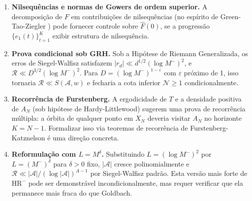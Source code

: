 \documentclass[12pt,a4paper]{article}
\theoremstyle{definition}
\newcommand{\HRm}{\mathrm{HR}^{-}}
\begin{document}
	\begin{enumerate}
		\item \textbf{Nilsequências e normas de Gowers de ordem superior.} A
		decomposição de $F$ em contribuições de nilsequências (no espírito de
		Green-Tao-Ziegler \cite{greentao}) pode fornecer controle sobre
		$\widehat{F}(0)$, se a progressão $\{e_1(t)\}_{t=1}^K$ exibir
		estrutura de nilsequência.
		
		\item \textbf{Prova condicional sob GRH.} Sob a Hipótese de Riemann
		Generalizada, os erros de Siegel-Walfisz satisfazem
		$|r_d| \ll d^{1/2}(\log M^-)^2$, e $\mathcal{R} \ll
		D^{3/2}(\log M^-)^2$. Para $D = (\log M^-)^{1-\varepsilon}$ com
		$\varepsilon$ próximo de 1, isso tornaria $\mathcal{R} \ll
		S(\mathcal{A},w)$ e fecharia a cota inferior $\mathcal{N} \geq 1$
		condicionalmente.
		
		\item \textbf{Recorrência de Furstenberg.} A ergodicidade de $T$ e
		a densidade positiva de $A_N$ (sob hipótese de Hardy-Littlewood)
		sugerem uma prova de recorrência múltipla: a órbita de qualquer ponto
		em $X_N$ deveria visitar $A_N$ no horizonte $K = N-1$. Formalizar
		isso via teoremas de recorrência de Furstenberg-Katznelson é uma
		direção concreta.
		
		\item \textbf{Reformulação com $L = M^\delta$.} Substituindo
		$L = (\log M^-)^2$ por $L = (M^-)^\delta$ para $\delta > 0$ fixo,
		$|\mathcal{A}|$ cresce polinomialmente e $\mathcal{R} \ll
		|\mathcal{A}|/(\log |\mathcal{A}|)^{A-1}$ por Siegel-Walfisz padrão.
		Esta versão mais forte de $\HRm$ pode ser demonstrável
		incondicionalmente, mas requer verificar que ela permanece mais fraca
		do que Goldbach.
	\end{enumerate}
	
\end{document}

